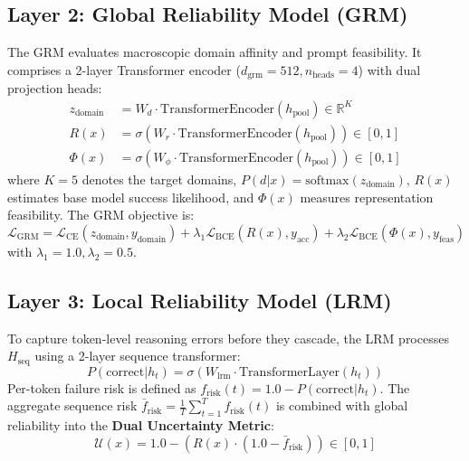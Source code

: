 \documentclass[journal,10pt,twocolumn]{IEEEtran}
\begin{document}
\subsection{Layer 2: Global Reliability Model (GRM)}
The GRM evaluates macroscopic domain affinity and prompt feasibility. It comprises a 2-layer Transformer encoder ($d_{\text{grm}} = 512, n_{\text{heads}} = 4$) with dual projection heads:
\begin{align}
z_{\text{domain}} &= W_d \cdot \text{TransformerEncoder}(h_{\text{pool}}) \in \mathbb{R}^{K} \\
R(x) &= \sigma(W_r \cdot \text{TransformerEncoder}(h_{\text{pool}})) \in [0, 1] \\
\Phi(x) &= \sigma(W_\phi \cdot \text{TransformerEncoder}(h_{\text{pool}})) \in [0, 1]
\end{align}
where $K=5$ denotes the target domains, $P(d|x) = \text{softmax}(z_{\text{domain}})$, $R(x)$ estimates base model success likelihood, and $\Phi(x)$ measures representation feasibility. The GRM objective is:
\begin{equation}
\mathcal{L}_{\text{GRM}} = \mathcal{L}_{\text{CE}}(z_{\text{domain}}, y_{\text{domain}}) + \lambda_1 \mathcal{L}_{\text{BCE}}(R(x), y_{\text{acc}}) + \lambda_2 \mathcal{L}_{\text{BCE}}(\Phi(x), y_{\text{feas}})
\end{equation}
with $\lambda_1 = 1.0, \lambda_2 = 0.5$.

\subsection{Layer 3: Local Reliability Model (LRM)}
To capture token-level reasoning errors before they cascade, the LRM processes $H_{\text{seq}}$ using a 2-layer sequence transformer:
\begin{equation}
P(\text{correct} | h_t) = \sigma(W_{\text{lrm}} \cdot \text{TransformerLayer}(h_t))
\end{equation}
Per-token failure risk is defined as $f_{\text{risk}}(t) = 1.0 - P(\text{correct} | h_t)$. The aggregate sequence risk $\bar{f}_{\text{risk}} = \frac{1}{T} \sum_{t=1}^T f_{\text{risk}}(t)$ is combined with global reliability into the \textbf{Dual Uncertainty Metric}:
\begin{equation}
\mathcal{U}(x) = 1.0 - \left( R(x) \cdot (1.0 - \bar{f}_{\text{risk}}) \right) \in [0, 1]
\end{equation}
\end{document}
